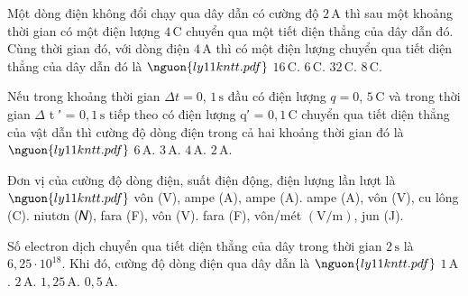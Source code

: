 \begin{ex}
Một dòng điện không đổi chạy qua dây dẫn có cường độ $2\,\mathrm{A}$ thì sau một khoảng thời gian có một điện lượng $4\,\mathrm{C}$ chuyển qua một tiết diện thẳng của dây dẫn đó. Cùng thời gian đó, với dòng điện $4\,\mathrm{A}$ thì có một điện lượng chuyển qua tiết diện thẳng của dây dẫn đó là $\nguon{ly11 kntt.pdf}$
\choice
{$16\,\mathrm{C}$.}
{$6\,\mathrm{C}$.}
{$32\,\mathrm{C}$.}
{\True $8\,\mathrm{C}$.}
\end{ex}

\begin{ex}
Nếu trong khoảng thời gian $\Delta t = 0$, $1\,\mathrm{s}$ đầu có điện lượng $q = 0$, $5\,\mathrm{C}$ và trong thời gian $\Delta$ t ′ = $0,1\,\mathrm{s}$ tiếp theo có điện lượng q′ = $0,1\,\mathrm{C}$ chuyển qua tiết diện thẳng của vật dẫn thì cường độ dòng điện trong cả hai khoảng thời gian đó là $\nguon{ly11 kntt.pdf}$
\choice
{$6\,\mathrm{A}$.}
{\True $3\,\mathrm{A}$.}
{$4\,\mathrm{A}$.}
{$2\,\mathrm{A}$.}
\end{ex}

\begin{ex}
Đơn vị của cường độ dòng điện, suất điện động, điện lượng lần lượt là $\nguon{ly11 kntt.pdf}$
\choice
{vôn (V), ampe (A), ampe (A).}
{\True ampe (A), vôn (V), cu lông (C).}
{niutơn (𝑁), fara (F), vôn (V).}
{fara (F), vôn/mét $(\mathrm{V/m})$, jun (J).}
\end{ex}

\begin{ex}
Số electron dịch chuyển qua tiết diện thẳng của dây trong thời gian $2\,\mathrm{s}$ là $6,25\cdot 10^{18}$. Khi đó, cường độ dòng điện qua dây dẫn là $\nguon{ly11 kntt.pdf}$
\choice
{$1\,\mathrm{A}$.}
{$2\,\mathrm{A}$.}
{$1,25\,\mathrm{A}$.}
{\True $0,5\,\mathrm{A}$.}
\end{ex}

